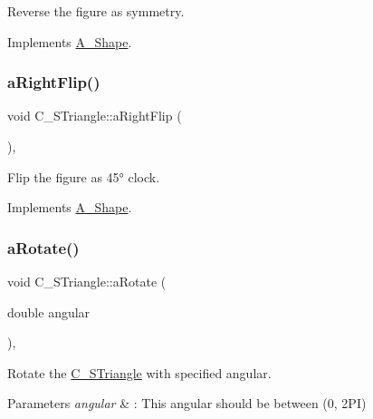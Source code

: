 Reverse the figure as symmetry. 



Implements \hyperlink{classA__Shape_afe2c7969d647f6358da13879a7534ecb}{A\+\_\+\+Shape}.

\mbox{\label{classC__STriangle_aa3cad7b7367c253000cf0f91f55ba600}} 
\subsubsection{\texorpdfstring{a\+Right\+Flip()}{aRightFlip()}}
{\footnotesize\ttfamily void C\+\_\+\+S\+Triangle\+::a\+Right\+Flip (\begin{DoxyParamCaption}{ }\end{DoxyParamCaption})\hspace{0.3cm}{\ttfamily [override]}, {\ttfamily [virtual]}}



Flip the figure as 45° clock. 



Implements \hyperlink{classA__Shape_a892688cbbad3297e00e87cce0dbfc76d}{A\+\_\+\+Shape}.

\mbox{\label{classC__STriangle_a52612242aba17043862355c030637a18}} 
\subsubsection{\texorpdfstring{a\+Rotate()}{aRotate()}}
{\footnotesize\ttfamily void C\+\_\+\+S\+Triangle\+::a\+Rotate (\begin{DoxyParamCaption}\item[{double}]{angular }\end{DoxyParamCaption})\hspace{0.3cm}{\ttfamily [override]}, {\ttfamily [virtual]}}



Rotate the \hyperlink{classC__STriangle}{C\+\_\+\+S\+Triangle} with specified angular. 


\begin{DoxyParams}{Parameters}
{\em angular} & \+: This angular should be between (0, 2\+PI) \\
\hline
\end{DoxyParams}


